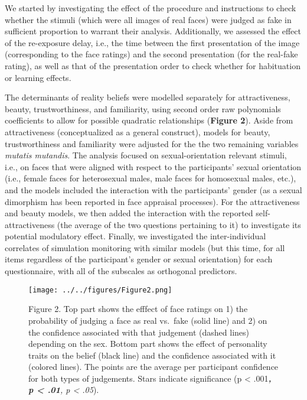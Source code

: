 \documentclass[
  man,
  floatsintext,
  longtable,
  nolmodern,
  notxfonts,
  notimes,
  colorlinks=true,linkcolor=blue,citecolor=blue,urlcolor=blue]{apa7}
\begin{document}
We started by investigating the effect of the procedure and instructions
to check whether the stimuli (which were all images of real faces) were
judged as fake in sufficient proportion to warrant their analysis.
Additionally, we assessed the effect of the re-exposure delay, i.e., the
time between the first presentation of the image (corresponding to the
face ratings) and the second presentation (for the real-fake rating), as
well as that of the presentation order to check whether for habituation
or learning effects.

The determinants of reality beliefs were modelled separately for
attractiveness, beauty, trustworthiness, and familiarity, using second
order raw polynomials coefficients to allow for possible quadratic
relationships (\textbf{Figure 2}). Aside from attractiveness
(conceptualized as a general construct), models for beauty,
trustworthiness and familiarity were adjusted for the the two remaining
variables \emph{mutatis mutandis}. The analysis focused on
sexual-orientation relevant stimuli, i.e., on faces that were aligned
with respect to the participants' sexual orientation (i.e., female faces
for heterosexual males, male faces for homosexual males, etc.), and the
models included the interaction with the participants' gender (as a
sexual dimorphism has been reported in face appraisal processes). For
the attractiveness and beauty models, we then added the interaction with
the reported self-attractiveness (the average of the two questions
pertaining to it) to investigate its potential modulatory effect.
Finally, we investigated the inter-individual correlates of simulation
monitoring with similar models (but this time, for all items regardless
of the participant's gender or sexual orientation) for each
questionnaire, with all of the subscales as orthogonal predictors.\\

\begin{figure}[H]

\caption{Figure 2. Top part shows the efffect of face ratings on 1) the
probability of judging a face as real vs.~fake (solid line) and 2) on
the confidence associated with that judgement (dashed lines) depending
on the sex. Bottom part shows the effect of personality traits on the
belief (black line) and the confidence associated with it (colored
lines). The points are the average per participant confidence for both
types of judgements. Stars indicate significance (p \textless{}
.001\emph{\textbf{, p \textless{} .01}, p \textless{} .05}).}

{\centering \texttt{[image: ../../figures/Figure2.png]}

}

\end{figure}%
\end{document}
